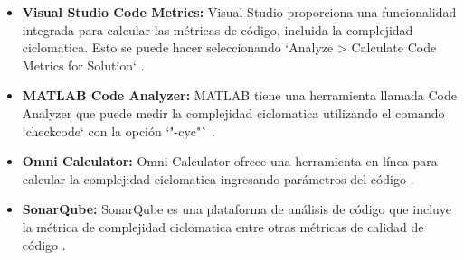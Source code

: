 \documentclass[10pt,authoryear,onecolumn]{article}
\begin{document}
\begin{itemize}
    \item \textbf{Visual Studio Code Metrics:}
    Visual Studio proporciona una funcionalidad integrada para calcular las métricas de código, incluida la complejidad ciclomatica. Esto se puede hacer seleccionando `Analyze > Calculate Code Metrics for Solution` \parencite{visualstudio2024}.
    
    \item \textbf{MATLAB Code Analyzer:}
    MATLAB tiene una herramienta llamada Code Analyzer que puede medir la complejidad ciclomatica utilizando el comando `checkcode` con la opción `"-cyc"` \parencite{matlab2024}.
    
        \item \textbf{Omni Calculator:}
    Omni Calculator ofrece una herramienta en línea para calcular la complejidad ciclomatica ingresando parámetros del código \parencite{omni2024}.
    
    \item \textbf{SonarQube:}
    SonarQube es una plataforma de análisis de código que incluye la métrica de complejidad ciclomatica entre otras métricas de calidad de código \parencite{sonarqube2024}.
    
\end{itemize}

\printbibliography
\end{document}
